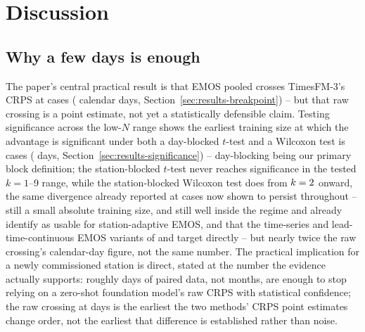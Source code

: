 \section{Discussion}
\label{sec:discussion}

\subsection{Why a few days is enough}
\label{sec:discussion-fewdays}

The paper's central practical result is that EMOS pooled crosses
TimesFM-3's CRPS at \BpCrpsPooledCases{} cases (\BpCrpsPooledDays{}
calendar days, Section~\ref{sec:results-breakpoint}) -- but that raw
crossing is a point estimate, not yet a statistically defensible claim.
Testing significance across the low-\(N\) range shows the earliest
training size at which the advantage is significant under both a
day-blocked \(t\)-test and a Wilcoxon test is \BpCrpsPooledSigK{} cases
(\BpCrpsPooledSigDays{} days, Section~\ref{sec:results-significance}) --
day-blocking being our primary block definition; the station-blocked
\(t\)-test never reaches significance in the tested \(k=1\)--9 range,
while the station-blocked Wilcoxon test does from
\(k=2{}\) onward, the same
divergence already reported at \SigTestNCases{} cases now shown to
persist throughout -- still a small absolute training size, and still
well inside the regime
\citet{baran_2016_combining} and \citet{gebetsberger_2018_estimation}
already identify as usable for station-adaptive EMOS, and that the
time-series and lead-time-continuous EMOS variants of
\citet{jobst_2024_ts_emos} and \citet{wessel_2024_leadtime_continuous}
target directly -- but nearly twice the raw crossing's calendar-day
figure, not the same number. The practical implication for a newly
commissioned station is direct, stated at the number the evidence
actually supports: roughly \BpCrpsPooledSigDays{} days of paired data,
not months, are enough to stop relying on a zero-shot foundation model's
raw CRPS with statistical confidence; the raw crossing at
\BpCrpsPooledDays{} days is the earliest the two methods' CRPS point
estimates change order, not the earliest that difference is established
rather than noise.

